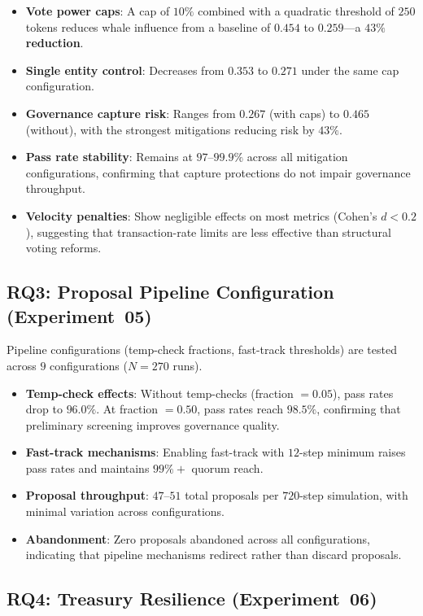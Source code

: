 \begin{itemize}
    \item \textbf{Vote power caps}: A cap of $10\%$ combined with a quadratic threshold of $250$ tokens reduces whale influence from a baseline of $0.454$ to $0.259$---a \textbf{$43\%$ reduction}.
    \item \textbf{Single entity control}: Decreases from $0.353$ to $0.271$ under the same cap configuration.
    \item \textbf{Governance capture risk}: Ranges from $0.267$ (with caps) to $0.465$ (without), with the strongest mitigations reducing risk by $43\%$.
    \item \textbf{Pass rate stability}: Remains at $97$--$99.9\%$ across all mitigation configurations, confirming that capture protections do not impair governance throughput.
    \item \textbf{Velocity penalties}: Show negligible effects on most metrics (Cohen's $d < 0.2$), suggesting that transaction-rate limits are less effective than structural voting reforms.
\end{itemize}

\subsection{RQ3: Proposal Pipeline Configuration (Experiment~05)}

Pipeline configurations (temp-check fractions, fast-track thresholds) are tested across $9$ configurations ($N=270$ runs).

\begin{itemize}
    \item \textbf{Temp-check effects}: Without temp-checks (fraction $= 0.05$), pass rates drop to $96.0\%$. At fraction $= 0.50$, pass rates reach $98.5\%$, confirming that preliminary screening improves governance quality.
    \item \textbf{Fast-track mechanisms}: Enabling fast-track with $12$-step minimum raises pass rates and maintains $99\%+$ quorum reach.
    \item \textbf{Proposal throughput}: $47$--$51$ total proposals per $720$-step simulation, with minimal variation across configurations.
    \item \textbf{Abandonment}: Zero proposals abandoned across all configurations, indicating that pipeline mechanisms redirect rather than discard proposals.
\end{itemize}

\subsection{RQ4: Treasury Resilience (Experiment~06)}

